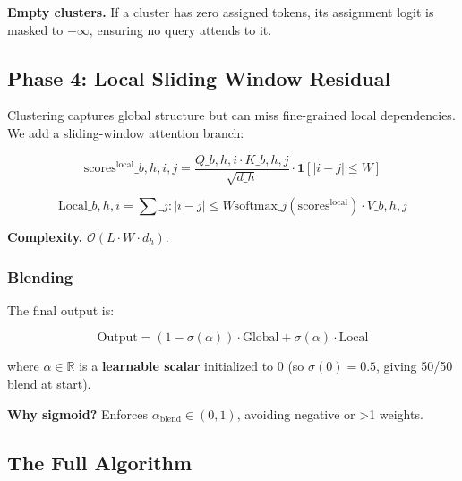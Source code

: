 \textbf{Empty clusters.} If a cluster has zero assigned tokens, its assignment 
logit is masked to $-\infty$, ensuring no query attends to it.

\subsection{Phase 4: Local Sliding Window Residual}

Clustering captures global structure but can miss fine-grained local 
dependencies. We add a sliding-window attention branch:

\[
\text{scores}^\text{local}\_{b,h,i,j} = \frac{Q\_{b,h,i} \cdot K\_{b,h,j}}{\sqrt{d\_h}} \cdot \mathbf{1}[|i - j| \leq W]
\]

\[
\text{Local}\_{b,h,i} = \sum\_{j: |i-j| \leq W} \text{softmax}\_j(\text{scores}^\text{local}) \cdot V\_{b,h,j}
\]

\textbf{Complexity.} $\mathcal{O}(L \cdot W \cdot d_h)$.

\subsubsection{Blending}

The final output is:

\[
\text{Output} = (1 - \sigma(\alpha)) \cdot \text{Global} + \sigma(\alpha) \cdot \text{Local}
\]

where $\alpha \in \mathbb{R}$ is a \textbf{learnable scalar} initialized to 0 
(so $\sigma(0) = 0.5$, giving 50/50 blend at start).

\textbf{Why sigmoid?} Enforces $\alpha_\text{blend} \in (0, 1)$, avoiding 
negative or \textgreater{}1 weights.

\subsection{The Full Algorithm}

